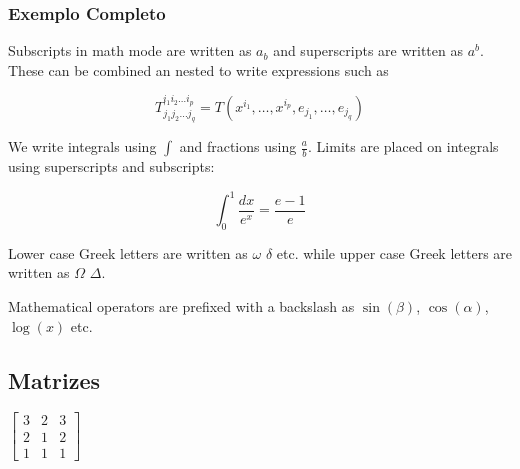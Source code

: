 \documentclass[12pt, a4paper]{article}
\begin{document}
\subsubsection{Exemplo Completo}

Subscripts in math mode are written as $a_b$ and superscripts are written as $a^b$. These can be combined an nested to write expressions such as

\[ T^{i_1 i_2 \dots i_p}_{j_1 j_2 \dots j_q} = T(x^{i_1},\dots,x^{i_p},e_{j_1},\dots,e_{j_q}) \]
 
We write integrals using $\int$ and fractions using $\frac{a}{b}$. Limits are placed on integrals using superscripts and subscripts:

\[ \int_0^1 \frac{dx}{e^x} =  \frac{e-1}{e} \]

Lower case Greek letters are written as $\omega$ $\delta$ etc. while upper case Greek letters are written as $\Omega$ $\Delta$.

Mathematical operators are prefixed with a backslash as $\sin(\beta)$, $\cos(\alpha)$, $\log(x)$ etc.

\subsection{Matrizes}
$
    \left[ %
    \begin{array}{ccc}
    3 & 2 & 3 \\
    2 & 1 & 2 \\
    1 & 1 & 1 
    \end{array}
    \right] %
$
\end{document}
